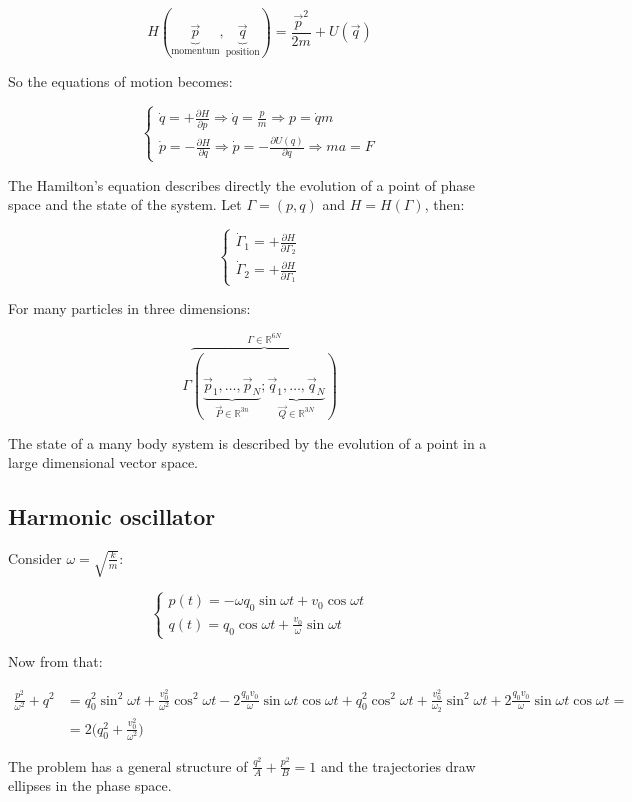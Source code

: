  $$H(\underbrace{\vec{p}}_{\text{momentum}}, \underbrace{\vec{q}}_{\text{position}}) = \frac{\vec{p}^2}{2m} + U(\vec{q})$$

  So the equations of motion becomes:

  $$\begin{cases}
    \dot{q} = + \frac{\partial {H}}{\partial {p}}\Rightarrow \dot{q} = \frac{p}{m}\Rightarrow p = \dot{q}m\\
    \dot{p} = - \frac{\partial {H}}{\partial {q}}\Rightarrow \dot{p} = -\frac{\partial {U(q)}}{\partial {q}}\Rightarrow ma = F
  \end{cases}$$

  The Hamilton's equation describes directly the evolution of a point of phase space and the state of the system.
  Let $\Gamma = (p,q)$ and $H = H(\Gamma)$, then:

  $$\begin{cases}
    \dot{\Gamma}_1 = +\frac{\partial {H}}{\partial {\Gamma_2}}\\
    \dot{\Gamma}_2 = +\frac{\partial {H}}{\partial {\Gamma_1}}
  \end{cases}$$

  For many particles in three dimensions:

  $$\Gamma\overbrace{(\underbrace{\vec{p}_1,\dots,\vec{p}_N}_{\vec{P}\in \mathbb{R}^{3n}};\underbrace{\vec{q}_1,\dots,\vec{q}_N}_{\vec{Q}\in \mathbb{R}^{3N}})}^{\Gamma\in \mathbb{R}^{6N}}$$

  The state of a many body system is described by the evolution of a point in a large dimensional vector space.

  \subsection{Harmonic oscillator}
  Consider $\omega = \sqrt{\frac{k}{m}}$:

  $$\begin{cases}
    p(t) = -\omega q_0\sin\omega t + v_0\cos\omega t\\
    q(t) = q_0\cos\omega t + \frac{v_0}{\omega}\sin\omega t
  \end{cases}$$

  Now from that:

  \begin{align*}
    \frac{p^2}{\omega^2}+q^2 &= q_0^2\sin^2\omega t + \frac{v_0^2}{\omega^2}\cos^2\omega t - 2 \frac{q_0v_0}{\omega}\sin \omega t\cos \omega t + q_0^2\cos^2\omega t + \frac{v_0^2}{\omega_2}\sin^2\omega t + 2\frac{q_0v_0}{\omega}\sin \omega t\cos \omega t =\\
                             &=2\biggl(q_0^2+\frac{v_0^2}{\omega^2}\biggr)
  \end{align*}

  The problem has a general structure of $\frac{q^2}{A}+\frac{p^2}{B}=1$ and the trajectories draw ellipses in the phase space.
